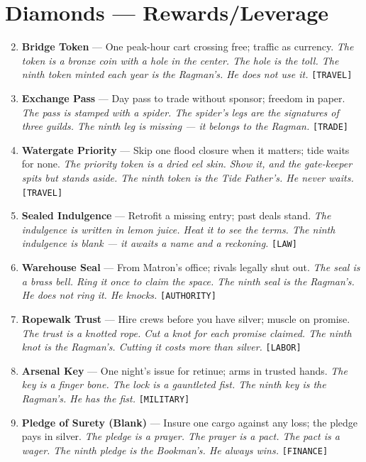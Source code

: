 \section*{Diamonds --- Rewards/Leverage}
\label{sec:silkstrand-rewards}
\begin{enumerate}
\setcounter{enumi}{1}
\item \textbf{Bridge Token} --- One peak-hour cart crossing free; traffic as currency.
  \hfill \textit{The token is a bronze coin with a hole in the center. The hole is the toll. The ninth token minted each year is the Ragman's. He does not use it.} \texttt{[TRAVEL]}
\item \textbf{Exchange Pass} --- Day pass to trade without sponsor; freedom in paper.
  \hfill \textit{The pass is stamped with a spider. The spider's legs are the signatures of three guilds. The ninth leg is missing --- it belongs to the Ragman.} \texttt{[TRADE]}
\item \textbf{Watergate Priority} --- Skip one flood closure when it matters; tide waits for none.
  \hfill \textit{The priority token is a dried eel skin. Show it, and the gate-keeper spits but stands aside. The ninth token is the Tide Father's. He never waits.} \texttt{[TRAVEL]}
\item \textbf{Sealed Indulgence} --- Retrofit a missing entry; past deals stand.
  \hfill \textit{The indulgence is written in lemon juice. Heat it to see the terms. The ninth indulgence is blank --- it awaits a name and a reckoning.} \texttt{[LAW]}
\item \textbf{Warehouse Seal} --- From Matron's office; rivals legally shut out.
  \hfill \textit{The seal is a brass bell. Ring it once to claim the space. The ninth seal is the Ragman's. He does not ring it. He knocks.} \texttt{[AUTHORITY]}
\item \textbf{Ropewalk Trust} --- Hire crews before you have silver; muscle on promise.
  \hfill \textit{The trust is a knotted rope. Cut a knot for each promise claimed. The ninth knot is the Ragman's. Cutting it costs more than silver.} \texttt{[LABOR]}
\item \textbf{Arsenal Key} --- One night's issue for retinue; arms in trusted hands.
  \hfill \textit{The key is a finger bone. The lock is a gauntleted fist. The ninth key is the Ragman's. He has the fist.} \texttt{[MILITARY]}
\item \textbf{Pledge of Surety (Blank)} --- Insure one cargo against any loss; the pledge pays in silver.
  \hfill \textit{The pledge is a prayer. The prayer is a pact. The pact is a wager. The ninth pledge is the Bookman's. He always wins.} \texttt{[FINANCE]}

\end{enumerate}
